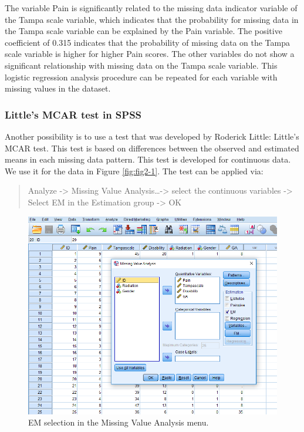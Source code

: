 \documentclass[]{book}
\begin{document}
The variable Pain is significantly related to the missing data indicator
variable of the Tampa scale variable, which indicates that the
probability for missing data in the Tampa scale variable can be
explained by the Pain variable. The positive coefficient of 0.315
indicates that the probability of missing data on the Tampa scale
variable is higher for higher Pain scores. The other variables do not
show a significant relationship with missing data on the Tampa scale
variable. This logistic regression analysis procedure can be repeated
for each variable with missing values in the dataset.

\subsubsection{Little's MCAR test in
SPSS}\label{littles-mcar-test-in-spss}

Another possibility is to use a test that was developed by Roderick
Little: Little's MCAR test. This test is based on differences between
the observed and estimated means in each missing data pattern. This test
is developed for continuous data. We use it for the data in Figure
\ref{fig:fig2-1}. The test can be applied via:

\begin{quote}
Analyze -\textgreater{} Missing Value Analysis\ldots{}-\textgreater{}
select the continuous variables -\textgreater{} Select EM in the
Estimation group -\textgreater{} OK
\end{quote}

\begin{figure}

{\centering \includegraphics[width=0.9\linewidth]{images/fig2.12} 

}

\caption{EM selection in the Missing Value Analysis menu.}\label{fig:fig2-12}
\end{figure}
\end{document}
